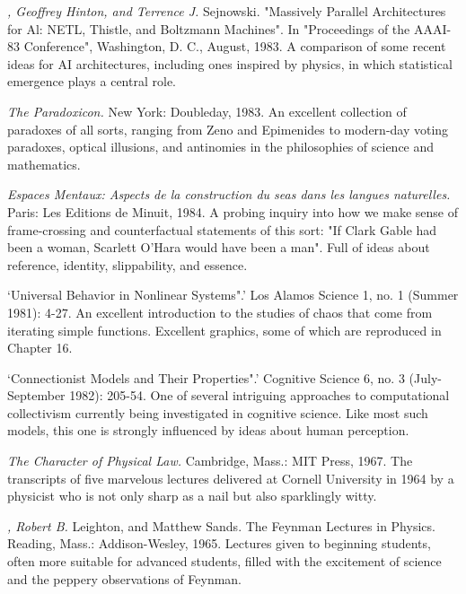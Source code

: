  {\sl , Geoffrey Hinton, and Terrence J.} Sejnowski. "Massively Parallel Architectures for Al: NETL, Thistle, and Boltzmann Machines". In "Proceedings of the AAAI-83 Conference", Washington, D. C., August, 1983. A comparison of some recent ideas for AI architectures, including ones inspired by physics, in which statistical emergence plays a central role.

 {\sl The Paradoxicon.} New York: Doubleday, 1983. An excellent collection of paradoxes of all sorts, ranging from Zeno and Epimenides to modern-day voting paradoxes, optical illusions, and antinomies in the philosophies of science and mathematics.

 {\sl Espaces Mentaux: Aspects de la construction du seas dans les langues naturelles.} Paris: Les Editions de Minuit, 1984. A probing inquiry into how we make sense of frame-crossing and counterfactual statements of this sort: "If Clark Gable had been a woman, Scarlett O'Hara would have been a man". Full of ideas about reference, identity, slippability, and essence.

 `Universal Behavior in Nonlinear Systems".' Los Alamos Science 1, no. 1 (Summer 1981): 4-27. An excellent introduction to the studies of chaos that come from iterating simple functions. Excellent graphics, some of which are reproduced in Chapter 16.

 `Connectionist Models and Their Properties".' Cognitive Science 6, no. 3 (July-September 1982): 205-54. One of several intriguing approaches to computational collectivism currently being investigated in cognitive science. Like most such models, this one is strongly influenced by ideas about human perception.

 {\sl The Character of Physical Law.} Cambridge, Mass.: MIT Press, 1967. The transcripts of five marvelous lectures delivered at Cornell University in 1964 by a physicist who is not only sharp as a nail but also sparklingly witty.

 {\sl , Robert B.} Leighton, and Matthew Sands. The Feynman Lectures in Physics. Reading, Mass.: Addison-Wesley, 1965. Lectures given to beginning students, often more suitable for advanced students, filled with the excitement of science and the peppery observations of Feynman.

